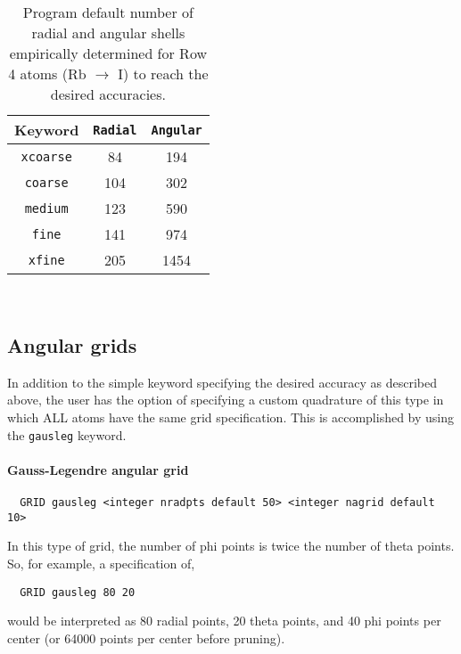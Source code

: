 \begin{table}[h]
\begin{center}
\caption{Program default number of radial and angular shells empirically determined for Row 4 atoms
  (Rb $\rightarrow$ I) to reach the desired accuracies.}

\vspace{.2in}

  \begin{tabular}[right]{|c|c|c|} \hline
Keyword & {\tt Radial} & {\tt Angular}  \\ \hline
{\tt xcoarse} & 84 &194  \\ \hline
{\tt coarse}  &104 &302  \\ \hline
{\tt medium}  &123 &590  \\ \hline
{\tt fine}    &141 &974  \\ \hline
{\tt xfine}   &205 &1454 \\ \hline
  \end{tabular} \\
\end{center}
\end{table}

\clearpage

\subsection{Angular grids}

In addition to the simple keyword specifying the desired accuracy as
described above, the user has the option of specifying a custom
quadrature of this type in which ALL atoms have the same grid
specification.  This is accomplished by using the \verb+gausleg+ keyword.

\paragraph{Gauss-Legendre angular grid}

\begin{verbatim}
  GRID gausleg <integer nradpts default 50> <integer nagrid default 10> 
\end{verbatim}

In this type of grid, the number of phi points is twice the number of
theta points. So, for example, a specification of,
\begin{verbatim}
  GRID gausleg 80 20
\end{verbatim}
would be interpreted as 80 radial points, 20 theta points, and 40
phi points per center (or 64000 points per center before pruning).

